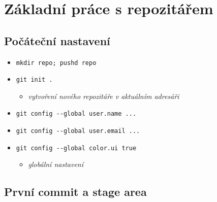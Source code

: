 \documentclass[10pt,twocolumn]{article}
\begin{document}
\section{Základní práce s repozitářem}
\subsection{Počáteční nastavení}

\begin{itemize}
  \item \texttt{mkdir repo; pushd repo}
  \item \texttt{git init .}
  \begin{itemize} \item \textit{vytvoření nového repozitáře v aktuálním adresáři} \end{itemize}
  \item \texttt{git config {-}{-}global user.name ...}
  \item \texttt{git config {-}{-}global user.email ...}
  \item \texttt{git config {-}{-}global color.ui true }
  \begin{itemize} \item \textit{globální nastavení} \end{itemize}
\end{itemize}

\subsection{První commit a stage area}
\end{document}

